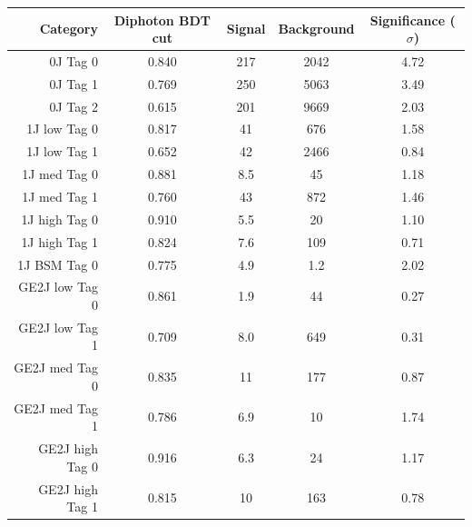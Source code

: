 \begin{table}
  \begin{centering}
    \begin{tabular}{ r | c | c | c | c } 
    \hline 
    Category         & Diphoton BDT cut & Signal & Background & Significance ($\sigma$) \\
    \hline 
    0J Tag 0         & 0.840            & 217    & 2042       & 4.72                    \\
    0J Tag 1         & 0.769            & 250    & 5063       & 3.49                    \\
    0J Tag 2         & 0.615            & 201    & 9669       & 2.03                    \\
    \hline                                                                              
    1J low  Tag 0    & 0.817            & 41     & 676        & 1.58                    \\
    1J low  Tag 1    & 0.652            & 42     & 2466       & 0.84                    \\
    1J med  Tag 0    & 0.881            & 8.5    & 45         & 1.18                    \\
    1J med  Tag 1    & 0.760            & 43     & 872        & 1.46                    \\
    1J high Tag 0    & 0.910            & 5.5    & 20         & 1.10                    \\
    1J high Tag 1    & 0.824            & 7.6    & 109        & 0.71                    \\
    1J BSM  Tag 0    & 0.775            & 4.9    & 1.2        & 2.02                    \\
    \hline                                                                              
    GE2J low  Tag 0  & 0.861            & 1.9    & 44         & 0.27                    \\
    GE2J low  Tag 1  & 0.709            & 8.0    & 649        & 0.31                    \\
    GE2J med  Tag 0  & 0.835            & 11     & 177        & 0.87                    \\
    GE2J med  Tag 1  & 0.786            & 6.9    & 10         & 1.74                    \\
    GE2J high Tag 0  & 0.916            & 6.3    & 24         & 1.17                    \\
    GE2J high Tag 1  & 0.815            & 10     & 163        & 0.78                    \\

\end{tabular}
\end{centering}
\end{table}
